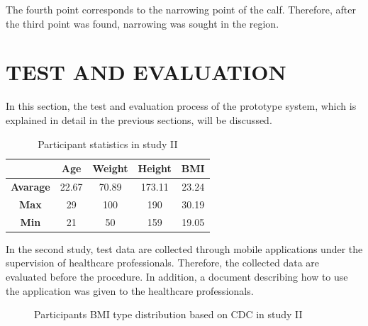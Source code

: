 The fourth point corresponds to the narrowing point of the calf. Therefore, after the third point was found, narrowing was sought in the region.

\section{TEST AND EVALUATION}\label{sec:StudyIITestAndEvaluation}

In this section, the test and evaluation process of the prototype system, which is explained in detail in the previous sections, will be discussed.

\begin{table}[htbp]
\begin{center}
\caption{Participant statistics in study II}
      \begin{tabular}{|c|c|c|c|c|} \hline
          & \textbf{Age} & \textbf{Weight} & \textbf{Height} & \textbf{BMI} \\ \hline
        \textbf{Avarage} & 22.67 & 70.89 & 173.11 & 23.24 \\ \hline
        \textbf{Max} & 29 & 100 & 190 & 30.19 \\ \hline
        \textbf{Min} & 21 & 50 & 159 & 19.05 \\ \hline
    \end{tabular}
\label{tab:StudyIIParticipantStatistics}
\end{center}
\end{table}

In the second study, test data are collected through mobile applications under the supervision of healthcare professionals. Therefore, the collected data are evaluated before the procedure. In addition, a document describing how to use the application was given to the healthcare professionals.

\begin{figure}[htbp]
\centering
{}
\caption{Participants BMI type distribution based on CDC in study II}
\label{fig:StudyIIParticipantsBMITypeDistribution}
\end{figure}

